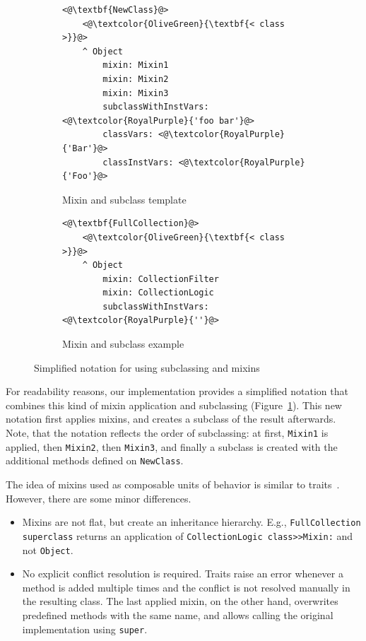 \begin{figure}[!htp]
\begin{subfigure}[b]{0.45\textwidth}
\begin{lstlisting}
<@\textbf{NewClass}@>
    <@\textcolor{OliveGreen}{\textbf{< class >}}@>
    ^ Object
        mixin: Mixin1
        mixin: Mixin2
        mixin: Mixin3
        subclassWithInstVars: <@\textcolor{RoyalPurple}{'foo bar'}@>
        classVars: <@\textcolor{RoyalPurple}{'Bar'}@>
        classInstVars: <@\textcolor{RoyalPurple}{'Foo'}@>
\end{lstlisting}
\caption{Mixin and subclass template}
\end{subfigure}
\qquad
\begin{subfigure}[b]{0.45\textwidth}
\begin{lstlisting}
<@\textbf{FullCollection}@>
    <@\textcolor{OliveGreen}{\textbf{< class >}}@>
    ^ Object
        mixin: CollectionFilter
        mixin: CollectionLogic
        subclassWithInstVars: <@\textcolor{RoyalPurple}{''}@>
\end{lstlisting}
\caption{Mixin and subclass example}
\end{subfigure}
\caption{Simplified notation for using subclassing and mixins}
\label{fig:usecase_subcl_mixin}
\end{figure}

For readability reasons, our implementation provides a simplified notation that combines this kind of mixin application and subclassing (Figure~\ref{fig:usecase_subcl_mixin}). This new notation first applies mixins, and creates a subclass of the result afterwards. Note, that the notation reflects the order of subclassing: at first, \texttt{Mixin1} is applied, then \texttt{Mixin2}, then \texttt{Mixin3}, and finally a subclass is created with the additional methods defined on \texttt{NewClass}.

The idea of mixins used as composable units of behavior is similar to traits~\cite{traitsschaerli}. However, there are some minor differences.
\begin{itemize}
    \item Mixins are not flat, but create an inheritance hierarchy. E.g., \texttt{FullCollection superclass} returns an application of \texttt{CollectionLogic class>>Mixin:} and not \texttt{Object}.
    \item No explicit conflict resolution is required. Traits raise an error whenever a method is added multiple times and the conflict is not resolved manually in the resulting class. The last applied mixin, on the other hand, overwrites predefined methods with the same name, and allows calling the original implementation using \texttt{super}.
\end{itemize}


